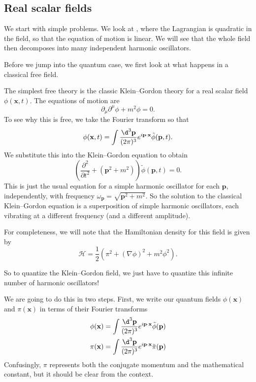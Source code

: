 \documentclass[a4paper]{article}
\begin{document}
\subsection{Real scalar fields}
We start with simple problems. We look at , where the Lagrangian is quadratic in the field, so that the equation of motion is linear. We will see that the whole field then decomposes into many independent harmonic oscillators.

Before we jump into the quantum case, we first look at what happens in a classical free field.
\begin{eg}
  The simplest free theory is the classic Klein--Gordon theory for a real scalar field $\phi(\mathbf{x}, t)$. The equations of motion are
  \[
    \partial_\mu \partial^\mu \phi + m^2 \phi = 0.
  \]
  To see why this is free, we take the Fourier transform so that
  \[
    \phi(\mathbf{x}, t) = \int \frac{\d^3 \mathbf{p}}{(2\pi)^3} e^{i \mathbf{p}\cdot \mathbf{x}} \tilde{\phi}(\mathbf{p}, t).
  \]
  We substitute this into the Klein--Gordon equation to obtain
  \[
    \left(\frac{\partial^2}{\partial t^2} + (\mathbf{p}^2 + m^2)\right)\tilde{\phi}(\mathbf{p}, t) = 0.
  \]
  This is just the usual equation for a simple harmonic oscillator for each $\mathbf{p}$, independently, with frequency $\omega_\mathbf{p} = \sqrt{\mathbf{p}^2 + m^2}$. So the solution to the classical Klein--Gordon equation is a superposition of simple harmonic oscillators, each vibrating at a different frequency (and a different amplitude).

  For completeness, we will note that the Hamiltonian density for this field is given by
  \[
    \mathcal{H} = \frac{1}{2}(\pi^2 + (\nabla \phi)^2 + m^2 \phi^2).
  \]
\end{eg}
So to quantize the Klein--Gordon field, we just have to quantize this infinite number of harmonic oscillators!

We are going to do this in two steps. First, we write our quantum fields $\phi(\mathbf{x})$ and $\pi(\mathbf{x})$ in terms of their Fourier transforms
\begin{align*}
  \phi(\mathbf{x}) &= \int \frac{\d^3 \mathbf{p}}{(2\pi)^3} e^{i\mathbf{p}\cdot \mathbf{x}} \tilde{\phi}(\mathbf{p})\\
  \pi(\mathbf{x}) &= \int \frac{\d^3 \mathbf{p}}{(2\pi)^3} e^{i\mathbf{p}\cdot \mathbf{x}} \tilde{\pi}(\mathbf{p})
\end{align*}
Confusingly, $\pi$ represents both the conjugate momentum and the mathematical constant, but it should be clear from the context.
\end{document}
